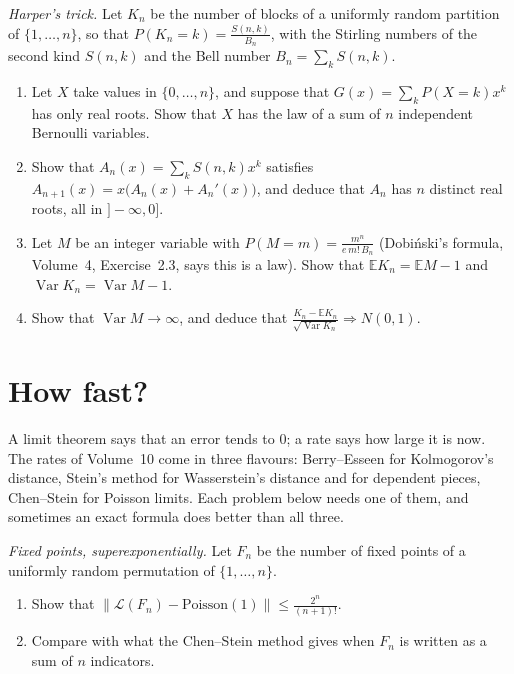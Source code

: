 \begin{exercise}[$\star\star\star$]\label{pb:harper}
\emph{Harper's trick.} Let $K_n$ be the number of blocks of a uniformly random partition of $\{1,\dots,n\}$, so that $P(K_n=k)=\frac{S(n,k)}{B_n}$, with the
Stirling numbers of the second kind $S(n,k)$ and the Bell number $B_n=\sum_kS(n,k)$.
\begin{enumerate}[label=(\alph*)]
\item Let $X$ take values in $\{0,\dots,n\}$, and suppose that $G(x)=\sum_kP(X=k)x^k$ has only real roots. Show that $X$ has the law of a sum of
$n$ independent Bernoulli variables.
\item Show that $A_n(x)=\sum_kS(n,k)x^k$ satisfies $A_{n+1}(x)=x\bigl(A_n(x)+A_n'(x)\bigr)$, and deduce that $A_n$ has $n$ distinct real roots, all in $]-\infty,0]$.
\item Let $M$ be an integer variable with $P(M=m)=\frac{m^n}{e\,m!\,B_n}$ (Dobi\'nski's formula, Volume~4, Exercise~2.3, says this is a law). Show that
$\mathbb EK_n=\mathbb EM-1$ and $\operatorname{Var}K_n=\operatorname{Var}M-1$.
\item Show that $\operatorname{Var}M\to\infty$, and deduce that $\frac{K_n-\mathbb EK_n}{\sqrt{\operatorname{Var}K_n}}\Rightarrow N(0,1)$.
\end{enumerate}
\end{exercise}

\section{How fast?}

A limit theorem says that an error tends to $0$; a rate says how large it is now. The rates of Volume~10 come in three flavours: Berry--Esseen for
Kolmogorov's distance, Stein's method for Wasserstein's distance and for dependent pieces, Chen--Stein for Poisson limits. Each problem below needs one
of them, and sometimes an exact formula does better than all three.

\begin{exercise}[$\star$]\label{pb:fixedtv}
\emph{Fixed points, superexponentially.} Let $F_n$ be the number of fixed points of a uniformly random permutation of $\{1,\dots,n\}$.
\begin{enumerate}[label=(\alph*)]
\item Show that $\bigl\|\mathcal L(F_n)-\text{Poisson}(1)\bigr\|\le\frac{2^n}{(n+1)!}$.
\item Compare with what the Chen--Stein method gives when $F_n$ is written as a sum of $n$ indicators.
\end{enumerate}
\end{exercise}

